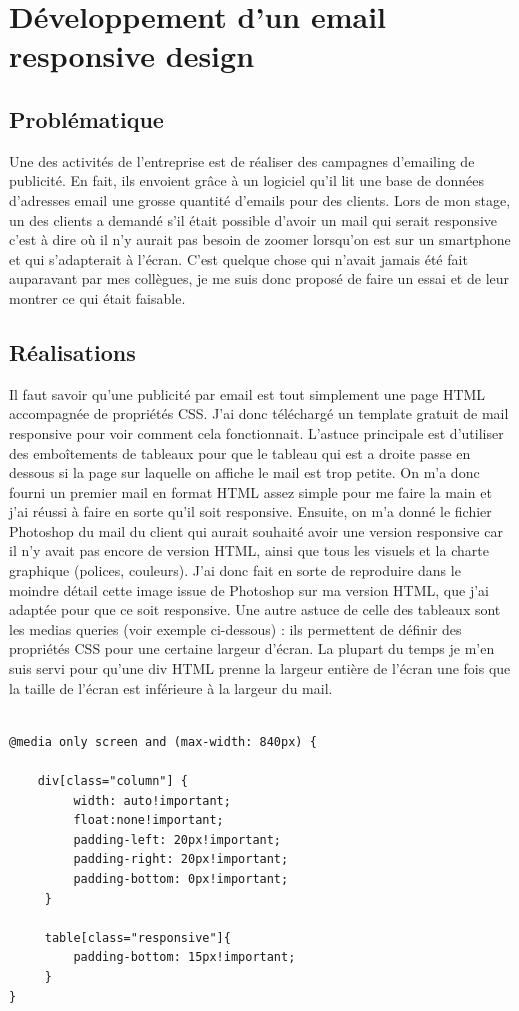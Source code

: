 \documentclass[report]{tnreport}
\begin{document}
\chapter{Développement d’un email responsive design}

\section{Problématique}
Une des activités de l’entreprise est de réaliser des campagnes d’emailing de publicité. En fait, ils envoient grâce à un logiciel qu’il lit une base de données d’adresses email une grosse quantité d’emails pour des clients. Lors de mon stage, un des clients a demandé s’il était possible d’avoir un mail qui serait responsive c’est à dire où il n’y aurait pas besoin de zoomer lorsqu’on est sur un smartphone et qui s'adapterait à l’écran. C’est quelque chose qui n’avait jamais été fait auparavant par mes collègues, je me suis donc proposé de faire un essai et de leur montrer ce qui était faisable.

\section{Réalisations}

Il faut savoir qu’une publicité par email est tout simplement une page HTML accompagnée de propriétés CSS.
J’ai donc téléchargé un template gratuit de mail responsive pour voir comment cela fonctionnait. L’astuce principale est d’utiliser des emboîtements de tableaux pour que le tableau qui est a droite passe en dessous si la page sur laquelle on affiche le mail est trop petite.
On m’a donc fourni un premier mail en format HTML assez simple pour me faire la main et j’ai réussi à faire en sorte qu’il soit responsive.
Ensuite, on m’a donné le fichier Photoshop du mail du client qui aurait souhaité avoir une version responsive car il n’y avait pas encore de version HTML, ainsi que tous les visuels et la charte graphique (polices, couleurs). J’ai donc fait en sorte de reproduire dans le moindre détail cette image issue de Photoshop sur ma version HTML, que j’ai adaptée pour que ce soit responsive. Une autre astuce de celle des tableaux sont les medias queries (voir exemple ci-dessous) : ils permettent de définir des propriétés CSS pour une certaine largeur d’écran. La plupart du temps je m’en suis servi pour qu’une div HTML prenne la largeur entière de l’écran une fois que la taille de l’écran est inférieure à la largeur du mail. 

\newpage
\begin{lstlisting}[language=html, caption={Exemple de media queries}, label={lst:mediaQuery}]

@media only screen and (max-width: 840px) {

	div[class="column"] {
		 width: auto!important; 
		 float:none!important;
		 padding-left: 20px!important;
	 	 padding-right: 20px!important;
		 padding-bottom: 0px!important;
	 }
	  
	 table[class="responsive"]{
		 padding-bottom: 15px!important;
	 }
}

\end{lstlisting}
\end{document}
